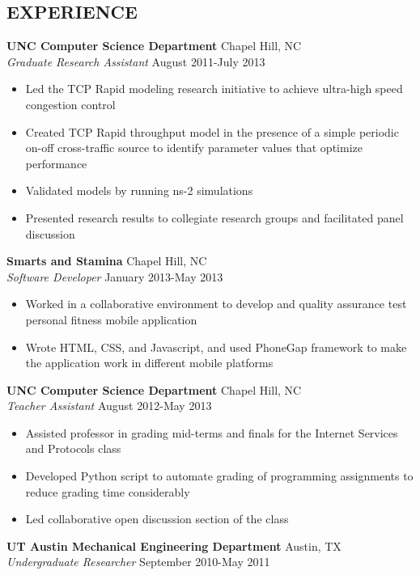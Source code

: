 \documentclass[line,margin]{res}
\begin{document}
\begin{resume}
\section{EXPERIENCE} 
  {\bf UNC Computer Science Department} \hfill Chapel Hill, NC \\
  \emph{Graduate Research Assistant} \hfill August 2011-July 2013
  \begin{itemize} \itemsep -2pt
    \item Led the TCP Rapid modeling research initiative to achieve 
    ultra-high speed congestion control
    \item Created TCP Rapid throughput model in the presence of a simple 
    periodic on-off cross-traffic source to identify parameter values that 
    optimize performance
    \item Validated models by running ns-2 simulations
    \item Presented research results to collegiate research groups and 
    facilitated panel discussion
  \end{itemize}
  {\bf Smarts and Stamina} \hfill Chapel Hill, NC \\
  \emph{Software Developer} \hfill January 2013-May 2013
  \begin{itemize} \itemsep -2pt
    \item Worked in a collaborative environment to develop and quality 
    assurance test personal fitness mobile application
    \item Wrote HTML, CSS, and Javascript, and used PhoneGap framework to make 
    the application work in different mobile platforms
  \end{itemize}
  {\bf UNC Computer Science Department} 
  \hfill Chapel Hill, NC \\
  \emph{Teacher Assistant} \hfill August 2012-May 2013
  \begin{itemize} \itemsep -2pt
    \item Assisted professor in grading mid-terms and finals for the Internet 
    Services and Protocols class
    \item Developed Python script to automate grading of programming 
    assignments to reduce grading time considerably
    \item Led collaborative open discussion section of the class
  \end{itemize}
  {\bf UT Austin Mechanical Engineering Department} \hfill Austin, TX \\
  \emph{Undergraduate Researcher} \hfill September 2010-May 2011
  \begin{itemize} \itemsep -2pt

\end{itemize}
\end{resume}
\end{document}
